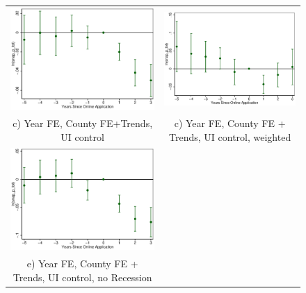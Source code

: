 \documentclass[11pt,letterpaper]{article}
\begin{document}
\begin{figure}
\begin{tabular}{cc}
\includegraphics[scale=0.57]{tabfig/evstu_snap_p_tot_one_yrcfcttru_5_3}&\includegraphics[scale=0.57]{tabfig/evstu_snap_p_tot_total_pop_yrcfcttru_5_3}\\
c) Year FE, County FE+Trends, UI control& c) Year FE, County FE + Trends, UI control, weighted\\
\includegraphics[scale=0.57]{tabfig/evstu_snap_p_tot_one_yrcfcttrunor_5_3}\\
e) Year FE, County FE + Trends, UI control, no Recession\\
\end{tabular}
\end{figure}
\end{document}

